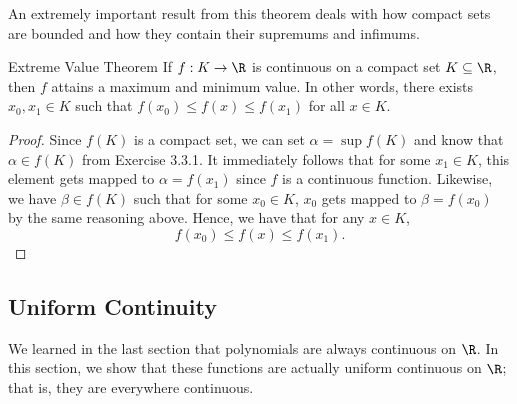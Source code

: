 An extremely important result from this theorem deals with how compact sets are bounded and how they contain their supremums and infimums.




\begin{theorem}{Extreme Value Theorem}{}
    If \( f: K \to \R  \) is continuous on a compact set \( K \subseteq \R  \), then \( f  \) attains a maximum and minimum value. In other words, there exists \( x_0, x_1 \in K  \) such that \( f(x_0) \leq f(x) \leq f(x_1) \) for all \( x \in K  \).
    \end{theorem}

\begin{proof}
    Since \( f(K) \) is a compact set, we can set \( \alpha = \sup f(K) \) and know that \( \alpha \in f(K) \) from Exercise 3.3.1. It immediately follows that for some \( x_1 \in K  \), this element gets mapped to \( \alpha = f(x_1) \) since \( f  \) is a continuous function. Likewise, we have \( \beta \in f(K) \) such that for some \( x_0 \in K  \), \( x_0  \) gets mapped to \( \beta = f(x_0 ) \) by the same reasoning above. Hence, we have that for any \( x \in K  \), 
    \[  f(x_0) \leq f(x) \leq f(x_1). \]
\end{proof}

\subsection{Uniform Continuity}

We learned in the last section that polynomials are always continuous on \( \R  \). In this section, we show that these functions are actually uniform continuous on \( \R  \); that is, they are everywhere continuous.

